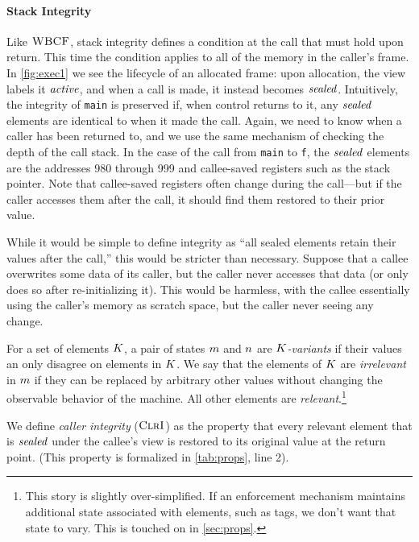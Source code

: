 \documentclass[10pt,conference]{ieeetran}%
\theoremstyle{definition}
\begin{document}

\paragraph*{Stack Integrity}

Like \(\textnormal{\sc WBCF}\), stack integrity defines a condition at the call that must hold upon
return. This time the condition applies to all of the memory in the caller's
frame. In \cref{fig:exec1} we see the lifecycle of an allocated frame:
upon allocation, the view labels it \(\mathit{active}\), and when a call is made, it instead
becomes \(\mathit{sealed}\). Intuitively, the integrity of {\tt main}
is preserved if, when control returns to it, any \(\mathit{sealed}\) elements
are identical to when it made the call.
%
Again, we need to know when a caller has been returned to,
and we use the same mechanism of checking the depth of the call stack.
%
In the case of the call from {\tt main} to {\tt f}, the \(\mathit{sealed}\) elements are the
addresses 980 through 999 and callee-saved registers such as
the stack pointer. Note that callee-saved registers often change
during the call---but if the caller accesses them after the call, it should find them
restored to their prior value.

While it would be simple to define integrity as ``all sealed elements retain their
values after the call,'' this would be stricter than necessary. Suppose that
a callee overwrites some data of its caller, but the caller never accesses that data
(or only does so after re-initializing it). This would be harmless, with the callee
essentially using the caller's memory as scratch space, but the caller never seeing any change.

For a set of elements \(K\),
a pair of states \(m\) and \(n\) are {\em \(K\)-variants} if
their values an only disagree on elements in \(K\).
We say that the elements of \(K\) are \emph{irrelevant}
in \(m\) if they can be replaced by arbitrary other values without changing the
observable behavior of the machine. All other elements are \emph{relevant}.\footnote{
This story is slightly over-simplified. If an enforcement mechanism maintains
additional state associated with elements, such as tags, we don't want that
state to vary. This is touched on in \cref{sec:props}.
}

We define \emph{caller integrity} (\(\textnormal{\sc ClrI}\))  as the property that
every relevant element that is \(\mathit{sealed}\) under the callee's view is restored
to its original value at the return point.
(This property is formalized in \cref{tab:props}, line 2).
\end{document}
